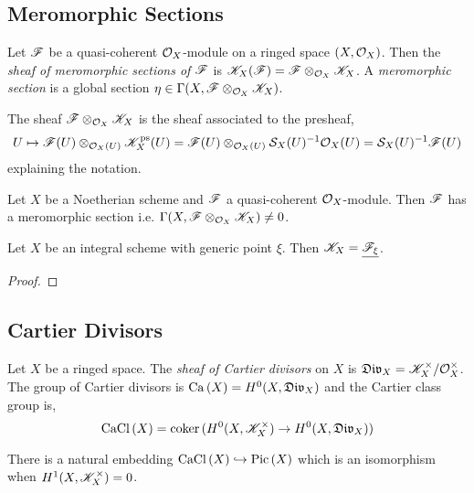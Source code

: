 \documentclass[12pt]{article}
\begin{document}
\subsection{Meromorphic Sections}

\begin{defn}
Let $\mathscr{F}$ be a quasi-coherent $\mathcal{O}_{X}$-module on a ringed space $(X, \mathcal{O}_{X})$. Then the \textit{sheaf of meromorphic sections of} $\mathscr{F}$ is $\mathscr{K}_X(\mathscr{F}) = \mathscr{F} \otimes_{\mathcal{O}_{X}} \mathscr{K}_X$. A \textit{meromorphic section} is a global section $\eta \in \Gamma(X, \mathscr{F} \otimes_{\mathcal{O}_{X}} \mathscr{K}_X)$.
\end{defn}

\begin{rmk}
The sheaf $\mathscr{F} \otimes_{\mathcal{O}_{X}} \mathscr{K}_X$ is the sheaf associated to the presheaf,
\[ U \mapsto \mathscr{F}(U) \otimes_{\mathcal{O}_{X}(U)} \mathscr{K}_X^{\text{ps}}(U) = \mathscr{F}(U) \otimes_{\mathcal{O}_{X}(U)} \mathcal{S}_X(U)^{-1} \mathcal{O}_{X}(U) = \mathcal{S}_X(U)^{-1} \mathscr{F}(U) \]
explaining the notation.
\end{rmk}

\begin{prop}
Let $X$ be a Noetherian scheme and $\mathscr{F}$ a quasi-coherent $\mathcal{O}_{X}$-module. Then $\mathscr{F}$ has a meromorphic section i.e. $\Gamma(X, \mathscr{F} \otimes_{\mathcal{O}_{X}} \mathscr{K}_X) \neq 0$.
\end{prop}

\begin{prop}
Let $X$ be an integral scheme with generic point $\xi$. Then $\mathscr{K}_X = \underline{\mathscr{F}_\xi}$.
\end{prop}

\begin{proof}

\end{proof}

\subsection{Cartier Divisors}

\begin{defn}
Let $X$ be a ringed space. The \textit{sheaf of Cartier divisors} on $X$ is $\mathfrak{Div}_X = \mathscr{K}_X^\times / \mathcal{O}_{X}^\times$. The group of Cartier divisors is $\mathrm{Ca}\left( X \right) = H^0(X, \mathfrak{Div}_X)$ and the Cartier class group is,
\[ \mathrm{CaCl}\left( X \right) = \operatorname{\mathrm{coker}}{(H^0(X, \mathscr{K}_X^\times) \to H^0(X, \mathfrak{Div}_X))} \]
\end{defn}

\begin{prop}
There is a natural embedding $\mathrm{CaCl}\left( X \right) \hookrightarrow \mathrm{Pic} \left( X \right)$ which is an isomorphism when $H^1(X, \mathscr{K}_X^\times) = 0$.
\end{prop}
\end{document}
